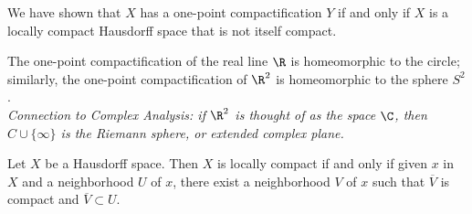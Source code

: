 \begin{remark}
We have shown that $X$ has a one-point compactification $Y$ if and only if $X$ is a locally compact Hausdorff space that is not itself compact.
\end{remark}

\begin{eg}
The one-point compactification of the real line $\R$ is homeomorphic to the circle; similarly, the one-point compactification of $\R^2$ is homeomorphic to the sphere $S^2$. \\

\textit{Connection to Complex Analysis: if $\R^2$ is thought of as the space $\C$, then $C \cup \{ \infty \}$ is the Riemann sphere, or extended complex plane.}
\end{eg}

\begin{theorem}
Let $X$ be a Hausdorff space. Then $X$ is locally compact if and only if given $x$ in $X$ and a neighborhood $U$ of $x$, there exist a neighborhood $V$ of $x$ such
that $\overline{V} $ is compact and $\overline{V} \subset U$.
\end{theorem}





